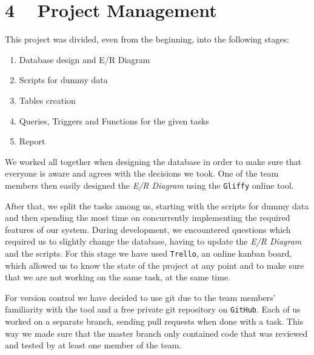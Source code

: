 \documentclass{article}
\begin{document}

\section{4 ~  Project Management}
\par {This project was divided, even from the beginning, into the following stages:
\begin{enumerate}
  \item Database design and E/R Diagram
  \item Scripts for dummy data
  \item Tables creation
  \item Queries, Triggers and Functions for the given tasks
  \item Report
\end{enumerate}}
\vspace{6pt}
\par {We worked all together when designing the database in order to make sure that everyone is aware and agrees with the decisions we took. One of the team members then easily designed the \textsl {E/R Diagram} using the \texttt{Gliffy} online tool.}\\
 
\par {After that, we split the tasks among us, starting with the scripts for dummy data and then spending the most time on concurrently implementing the required features of our system. During development, we encountered questions which required us to slightly change the database, having to update the \textsl{E/R Diagram} and the scripts. For this stage we have used \texttt{Trello}, an online kanban board, which allowed us to know the state of the project at any point and to make sure that we are not working on the same task, at the same time.}\\
 
\par {For version control we have decided to use git due to the team members' familiarity with the tool and a free private git repository on \texttt{GitHub}. Each of us worked on a separate branch, sending pull requests when done with a task. This way we made sure that the master branch only contained code that was reviewed and tested by at least one member of the team.}\\
\end{document}
